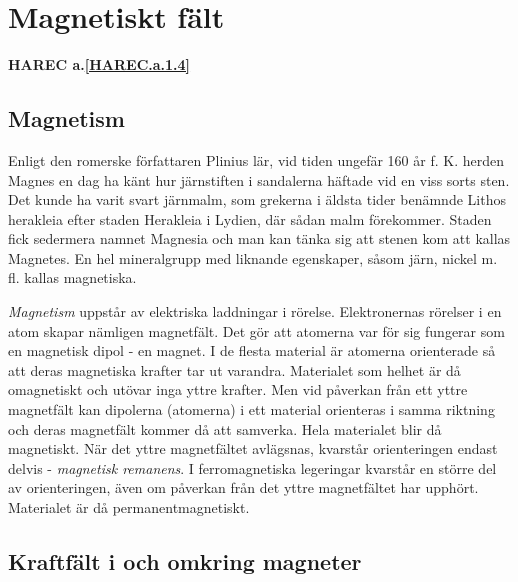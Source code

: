 \section{Magnetiskt fält}
\textbf{HAREC a.\ref{HAREC.a.1.4}\label{myHAREC.a.1.4}}

\subsection{Magnetism}

Enligt den romerske författaren Plinius lär, vid tiden ungefär 160 år f. K.
herden Magnes en dag ha känt hur järnstiften i sandalerna häftade vid en viss
sorts sten. Det kunde ha varit svart järnmalm, som grekerna i äldsta tider
benämnde Lithos herakleia efter staden Herakleia i Lydien, där sådan malm
förekommer. Staden fick sedermera namnet Magnesia och man kan tänka sig att
stenen kom att kallas Magnetes. En hel mineralgrupp med liknande egenskaper,
såsom järn, nickel m. fl. kallas magnetiska.

\emph{Magnetism} uppstår av elektriska laddningar i rörelse. Elektronernas rörelser i
en atom skapar nämligen magnetfält. Det gör att atomerna var för sig fungerar
som en magnetisk dipol - en magnet. I de flesta material är atomerna
orienterade så att deras magnetiska krafter tar ut varandra. Materialet som
helhet är då omagnetiskt och utövar inga yttre krafter. Men vid påverkan från
ett yttre magnetfält kan dipolerna (atomerna) i ett material orienteras i samma
riktning och deras magnetfält kommer då att samverka. Hela materialet blir då
magnetiskt. När det yttre magnetfältet avlägsnas, kvarstår orienteringen endast
delvis - \emph{magnetisk remanens}. I ferromagnetiska legeringar kvarstår en
större del av orienteringen, även om påverkan från det yttre magnetfältet har
upphört. Materialet är då permanentmagnetiskt.

\subsection{Kraftfält i och omkring magneter}

